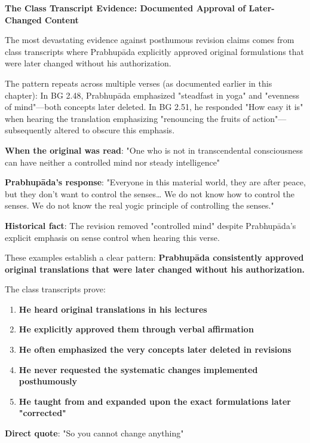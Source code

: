 \documentclass[12pt,twoside]{book}
\begin{document}
\vspace{0.5cm}
\textbf{The Class Transcript Evidence: Documented Approval of Later-Changed Content}
\vspace{0.2cm}


The most devastating evidence against posthumous revision claims comes from class transcripts where Prabhupāda explicitly approved original formulations that were later changed without his authorization.

The pattern repeats across multiple verses (as documented earlier in this chapter): In BG 2.48, Prabhupāda emphasized "steadfast in yoga" and "evenness of mind"—both concepts later deleted. In BG 2.51, he responded "How easy it is" when hearing the translation emphasizing "renouncing the fruits of action"—subsequently altered to obscure this emphasis.

\textbf{\textbf{When the original was read}}: "One who is not in transcendental consciousness can have neither a controlled mind nor steady intelligence"

\textbf{\textbf{Prabhupāda's response}}: "Everyone in this material world, they are after peace, but they don't want to control the senses\ldots{} We do not know how to control the senses. We do not know the real yogic principle of controlling the senses."

\textbf{\textbf{Historical fact}}: The revision removed "controlled mind" despite Prabhupāda's explicit emphasis on sense control when hearing this verse.

These examples establish a clear pattern: \textbf{\textbf{Prabhupāda consistently approved original translations that were later changed without his authorization.}}

The class transcripts prove:
\begin{enumerate}
\item \textbf{\textbf{He heard original translations in his lectures}}
\item \textbf{\textbf{He explicitly approved them through verbal affirmation}}
\item \textbf{\textbf{He often emphasized the very concepts later deleted in revisions}}
\item \textbf{\textbf{He never requested the systematic changes implemented posthumously}}
\item \textbf{\textbf{He taught from and expanded upon the exact formulations later "corrected"}}
\end{enumerate}


\textbf{\textbf{Direct quote}}: "So you cannot change anything"
\end{document}
